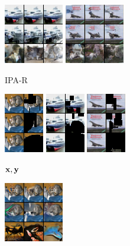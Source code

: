 \begin{figure}[t]
\begin{subfigure}[t]{0.17\textwidth}
      \includegraphics[height=\cifarimgheight]{figs/cigcvae/image-samples/cifar10/freeform_aipo-r_1_samples}
      \includegraphics[height=\cifarimgheight]{figs/cigcvae/image-samples/cifar10/freeform_aipo-r_3_samples}
      \caption{IPA-R}
    \end{subfigure}
    \begin{subfigure}[t]{0.11\textwidth}
      \centering
      \includegraphics[height=\cifarimgheight]{figs/cigcvae/image-samples/cifar10/freeform_aipo_0_gt_masked}
      \includegraphics[height=\cifarimgheight]{figs/cigcvae/image-samples/cifar10/freeform_aipo_1_gt_masked}
      \includegraphics[height=\cifarimgheight]{figs/cigcvae/image-samples/cifar10/freeform_aipo_3_gt_masked}
      \caption*{$\mathbf{x}, \mathbf{y}$}
    \end{subfigure}
    \begin{subfigure}[t]{0.17\textwidth}
      \centering
      \includegraphics[height=\cifarimgheight]{figs/cigcvae/image-samples/cifar10/freeform_co_mod_gan_0_samples}

\end{subfigure}
\end{figure}
